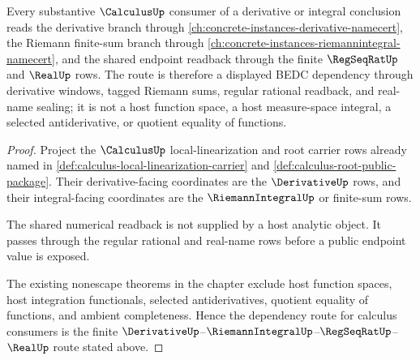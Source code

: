 \begin{lemma}
\label{lem:calculus-riemann-integral-dependency-route}
Every substantive $\CalculusUp$ consumer of a derivative or integral conclusion reads the derivative branch through \autoref{ch:concrete-instances-derivative-namecert}, the Riemann finite-sum branch through \autoref{ch:concrete-instances-riemannintegral-namecert}, and the shared endpoint readback through the finite $\RegSeqRatUp$ and $\RealUp$ rows. The route is therefore a displayed BEDC dependency through derivative windows, tagged Riemann sums, regular rational readback, and real-name sealing; it is not a host function space, a host measure-space integral, a selected antiderivative, or quotient equality of functions.
\end{lemma}
\begin{proof}
Project the $\CalculusUp$ local-linearization and root carrier rows already named in \autoref{def:calculus-local-linearization-carrier} and \autoref{def:calculus-root-public-package}. Their derivative-facing coordinates are the $\DerivativeUp$ rows, and their integral-facing coordinates are the $\RiemannIntegralUp$ or finite-sum rows.

The shared numerical readback is not supplied by a host analytic object. It passes through the regular rational and real-name rows before a public endpoint value is exposed.

The existing nonescape theorems in the chapter exclude host function spaces, host integration functionals, selected antiderivatives, quotient equality of functions, and ambient completeness. Hence the dependency route for calculus consumers is the finite $\DerivativeUp$--$\RiemannIntegralUp$--$\RegSeqRatUp$--$\RealUp$ route stated above.
\end{proof}

